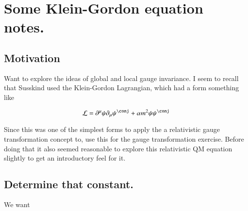 
%
%




\chapter{Some Klein-Gordon equation notes. }
\label{chap:PJkgNotes}
\date{ March 27, 2009.  kleinGordon.tex }

%

\section{Motivation }

Want to explore the ideas of global and local gauge invariance.  I seem to recall that Susskind
used the Klein-Gordon Lagrangian, which had a form something like

\begin{align}\label{eqn:klein_gordon:densityUndeterminedCoeff}
\LL = \partial^\mu \psi \partial_\mu \psi^\conj + \alpha m^2 \psi \psi^\conj
\end{align}

Since this was one of the simplest forms to apply the
a relativistic gauge transformation concept to, use this for the gauge transformation exercise.  Before doing that it also seemed reasonable to
explore this relativistic QM equation slightly to get an introductory feel for it.

\section{Determine that constant. }

We want

